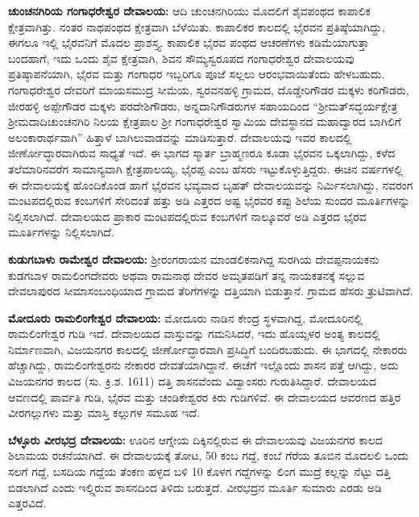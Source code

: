 \textbf{ಚುಂಚನಗಿರಿಯ ಗಂಗಾಧರೇಶ್ವರ ದೇವಾಲಯ:} ಆದಿ ಚುಂಚನಗಿರಿಯು ಮೊದಲಿಗೆ ಶೈವಪಂಥದ ಕಾಪಾಲಿಕ ಕ್ಷೇತ್ರವಾಗಿತ್ತು. ನಂತರ ನಾಥಪಂಥದ ಕ್ಷೇತ್ರವಾಗಿ ಬೆಳೆಯಿತು. ಕಾಪಾಲಿಕರ ಕಾಲದಲ್ಲಿ ಭೈರವನ ಪ್ರತಿಷ್ಠೆಯಾಗಿದ್ದು, ಈಗಲೂ ಇಲ್ಲಿ ಭೈರವನಿಗೆ ಮೊದಲ ಪ್ರಾಶಸ್ತ್ಯ. ಕಾಪಾಲಿಕ ಭೈರವ ಪಂಥದ ಆಚರಣೆಗಳು ಕಡಿಮೆಯಾಗುತ್ತಾ ಬಂದಹಾಗೆ, ಇದು ಒಂದು ಶೈವ ಕ್ಷೇತ್ರವಾಗಿ, ಶಿವನ ಸೌಮ್ಯಸ್ವರೂಪದ ಗಂಗಾಧರೇಶ್ವರ ದೇವಾಲಯವು ಪ್ರತಿಷ್ಠಾಪನೆಯಾಗಿ, ಭೈರವ ಮತ್ತು ಗಂಗಾಧರ ಇಬ್ಬರಿಗೂ ಪೂಜೆ ಸಲ್ಲಲು ಆರಂಭವಾಯಿತೆಂದು ಹೇಳಬಹುದು. ಗಂಗಾಧರೇಶ್ವರ ದೇವರಿಗೆ ಮಾಯಸಮುದ್ರ ಸೀಮೆಯ, ಸ್ವರವನಹಳ್ಳಿ ಗ್ರಾಮದ, ದೊಡ್ಡೇರಿಗೌಡರ ಮಕ್ಕಳು ಕರಿಗೌಡರು, ಜೀರಹಳ್ಳಿ ಅಪ್ಪೇಗೌಡರ ಮಕ್ಕಳು ಪರದೇಶಿಗೌಡರು, ಅನ್ನದಾನಿಗೌಡರುಗಳ ಸಹಾಯದಿಂದ “ಶ‍್ರೀಮತ್​ಸದ್ಭರ್ಯಕ್ಷೇತ್ರ ಶ‍್ರೀಮದಾದಿಚುಂಚನಗಿರಿ ನಿಲಯ ಕ್ಷೇತ್ರಪಾಲ ಶ‍್ರೀ ಗಂಗಾಧರೇಶ್ವರ ಸ್ವಾಮಿಯ ದೇವಸ್ಥಾನದ ಮಹಾದ್ವಾರದ ಬಾಗಿಲಿಗೆ ಅಲಂಕಾರಾರ್ಥವಾಗಿ” ಹಿತ್ತಾಳೆ ಬಾಗಿಲುವಾಡವನ್ನು ಮಾಡಿಸುತ್ತಾರೆ. ದೇವಾಲಯವು ಇವರ ಕಾಲದಲ್ಲಿ ಜೀರ್ಣೋದ್ಧಾರವಾಗಿರುವ ಸಾಧ್ಯತೆ ಇದೆ. ಈ ಭಾಗದ ಸ್ಮಾರ್ತ ಬ್ರಾಹ್ಮಣರೂ ಕೂಡಾ ಭೈರವನ ಒಕ್ಕಲಾಗಿದ್ದು, ಕಳೆದ ತಲೆಮಾರಿನವರೆಗ ಸಾಮಾನ್ಯವಾಗಿ ಕ್ಷೇತ್ರಪಾಲಯ್ಯ, ಭೈರಪ್ಪ ಎಂಬ ಹೆಸರು ಇಟ್ಟುಕೊಳ್ಳುತ್ತಿದ್ದರು. ಈಚಿನ ವರ್ಷಗಳಲ್ಲಿ ಈ ದೇವಾಲಯಕ್ಕೆ ಹೊಂದಿಕೊಂಡ ಹಾಗೆ ಭೈರವನ ಭವ್ಯವಾದ ಬೃಹತ್ ದೇವಾಲಯವನ್ನು ನಿರ್ಮಿಸಲಾಗಿದ್ದು, ನವರಂಗ ಮಂಟಪದಲ್ಲಿರುವ ಕಂಬಗಳಿಗೆ ಸೇರಿದಂತೆ ಹತ್ತು ಅಡಿ ಎತ್ತರದ ಅಷ್ಟ ಭೈರವರ ಕಪ್ಪು ಶಿಲೆಯ ಸುಂದರ ಮೂರ್ತಿಗಳನ್ನು ನಿಲ್ಲಿಸಲಾಗಿದೆ. ದೇವಾಲಯದ ಪ್ರಾಕಾರ ಮಂಟಪದಲ್ಲಿರುವ ಕಂಬಗಳಿಗೆ ನಾಲ್ಕೂವರೆ ಅಡಿ ಎತ್ತರದ  ಭೈರವ ಮೂರ್ತಿಗಳನ್ನು ನಿಲ್ಲಿಸಲಾಗಿದೆ.

\textbf{ಕುಡುಗಬಾಳು ರಾಮೇಶ್ವರ ದೇವಾಲಯ:} ಶ‍್ರೀರಂಗರಾಯನ ಮಾಂಡಲಿಕನಾಗಿದ್ದ ಸುರಗಿಯ ದೇವಪ್ಪನಾಯಕನು ಕುಡಗಬಾಳ ರಾಮಲಿಂಗದೇವರು ಅಥವಾ ರಾಮನಾಥ ದೇವರ ಅಮೃತಪಡಿಗೆ ತನ್ನ ನಾಯಕತನಕ್ಕೆ ಸಲ್ಲುವ ದೇವಲಾಪುರದ ಸೀಮಾಸಂಬಂಧಿಯಾದ ಗ್ರಾಮದ ತೆರಿಗೆಗಳನ್ನು ದತ್ತಿಯಾಗಿ ಬಿಡುತ್ತಾನೆ. ಗ್ರಾಮದ ಹೆಸರು ತ್ರುಟಿವಾಗಿದೆ.

\textbf{ಮೋದೂರು ರಾಮಲಿಂಗೇಶ್ವರ ದೇವಾಲಯ:} ಮೋದೂರು ನಾಡಿನ ಕೇಂದ್ರ ಸ್ಥಳವಾಗಿದ್ದ, ಮೋದೂರಿನಲ್ಲಿ ರಾಮಲಿಂಗೇಶ್ವರ ಗುಡಿ ಇದೆ. ದೇವಾಲಯದ ವಾಸ್ತುವನ್ನು ಗಮನಿಸಿದರೆ, ಇದು ಹೊಯ್ಸಳರ ಅಂತ್ಯ ಕಾಲದಲ್ಲಿ ನಿರ್ಮಾಣವಾಗಿ, ವಿಜಯನಗರ ಕಾಲದಲ್ಲಿ ಜೀರ್ಣೋದ್ಧಾರವಾಗಿ ಪ್ರಸಿದ್ಧಿಗೆ ಬಂದಿರಬಹುದು. ಈ ಭಾಗದಲ್ಲಿ ನೇಕಾರರು ಹೆಚ್ಚಾಗಿದ್ದು, ರಾಮಲಿಂಗೇಶ್ವರನು ನೇಕಾರರ ದೇವತೆಯಾಗಿದ್ದಾನೆ. ಈಚೆಗೆ ಇಲ್ಲೊಂದು ಶಾಸನ ಪತ್ತೆ ಆಗಿದ್ದು, ಅದು ವಿಜಯನಗರ ಕಾಲದ (ಸು. ಕ್ರಿ.ಶ. 1611) ದತ್ತಿ ಶಾಸನವೆಂದು ವಿದ್ವಾಂಸರು ಗುರುತಿಸಿದ್ದಾರೆ. ದೇವಾಲಯದ ಆವಣದಲ್ಲಿ ಪಾರ್ವತಿ ಗುಡಿ, ಭೈರವ ಮತ್ತು ಚಂಡಿಕೇಶ್ವರರ ಕಿರು ಗುಡಿಗಳಿವೆ. ಈ ದೇವಾಲಯದ ಆವರಣದ ಹತ್ತಿರ ವೀರಗಲ್ಲುಗಳು ಮತ್ತು ಮಾಸ್ತಿ ಕಲ್ಲುಗಳ ಸಮೂಹ ಇದೆ.

\textbf{ಬೆಳ್ಳೂರು ವೀರಭದ್ರ ದೇವಾಲಯ:} ಊರಿನ ಆಗ್ನೇಯ ದಿಕ್ಕಿನಲ್ಲಿರುವ ಈ ದೇವಾಲಯವು ವಿಜಯನಗರ ಕಾಲದ ಶಿಲಾಮಯ ರಚನೆಯಾಗಿದೆ. ಈ ದೇವಾಲಯಕ್ಕೆ ತೋಟ, 50 ಕಂಬ ಗದ್ದೆ, ಕಂಬೆ ಗೆರೆಯ ತೂಬಿನ ಮೊದಲಲಿ ಒಂದು ಸಲಗೆ ಗದ್ದೆ, ಬಸದಿಯ ಗದ್ದೆಯ ತೆಂಕಣ ಹಳ್ಳದ ಬಳಿ 10 ಕೊಳಗ ಗದ್ದೆಗಳನ್ನು ಲಿಂಗ ಮುದ್ರೆ ಕಲ್ಲನ್ನು ನೆಟ್ಟು ದತ್ತಿ ಬಿಡಲಾಗಿದೆ ಎಂದು ಇಲ್ಲ್ಲಿರುವ ಶಾಸನದಿಂದ ತಿಳಿದು ಬರುತ್ತದೆ. ವೀರಭದ್ರನ ಮೂರ್ತಿ ಸುಮಾರು ಎರಡು ಅಡಿ ಎತ್ತರವಿದೆ.


